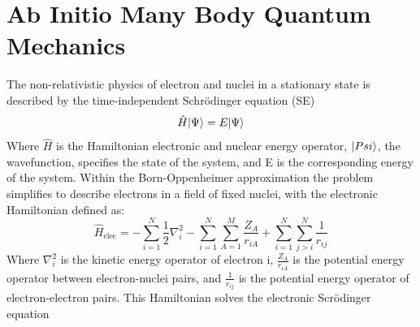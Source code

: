 
\section{Ab Initio Many Body Quantum Mechanics}
 The non-relativistic physics of electron and nuclei in a stationary state is described by the time-independent Schr{\"o}dinger equation (SE)
   \begin{equation}\label{SE}
    \hat{H}| \Psi \rangle = E| \Psi \rangle
   \end{equation}
  Where $\hat{H}$ is the Hamiltonian electronic and nuclear energy operator, $| Psi \rangle$, the wavefunction, specifies the state of the system, and E is the corresponding energy of the system.
  Within the Born-Oppenheimer approximation\cite{SzaboAttila1982} the problem simplifies to describe electrons in a field of fixed nuclei, with the electronic Hamiltonian defined as: 
   \begin{equation}
    \hat{H}_{\text{elec}} = -\sum_{i=1}^{N} \frac{1}{2} \nabla_{i}^{2} - \sum_{i=1}^{N}\sum_{A=1}^{M} \frac{Z_A}{r_{iA}} + \sum_{i=1}^{N}\sum_{j>i}^{N} \frac{1}{r_{ij}}
   \end{equation}
  Where $\nabla_{i}^2$ is the kinetic energy operator of electron i, $\frac{Z_A}{r_{iA}}$ is the potential energy operator between electron-nuclei pairs, and $\frac{1}{r_{ij}}$ is the potential energy operator of electron-electron pairs. This Hamiltonian solves the electronic Scr{\"o}dinger equation
